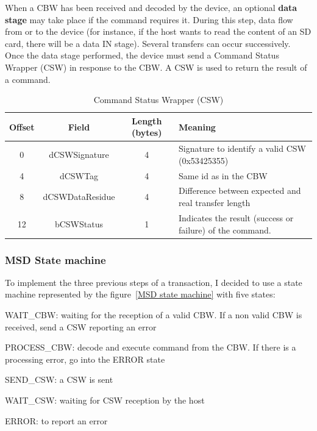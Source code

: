 \documentclass[pdftex,10pt,a4paper]{report}
\newenvironment{packed_item}{
\begin{itemize}
  \setlength{\itemsep}{1pt}
  \setlength{\parskip}{0pt}
  \setlength{\parsep}{0pt}
}{\end{itemize}}
\begin{document}
When a CBW has been received and decoded by the device, an optional \textbf{data stage} may take
place if the command requires it. During this step, data flow from or to the device (for instance, if the host wants to read the content of an SD card, there will be a data IN stage). Several transfers can occur successively.
\\

Once the data stage performed, the device must send a Command Status Wrapper (CSW) in response to the CBW. A CSW is used to return the result of a command.

\begin{table}[h!]
\centering
\begin{tabular}{|c|c|c| >{\arraybackslash}m{9cm} |}
\hline

Offset & Field & Length (bytes) & Meaning \\ \hline
0 & dCSWSignature & 4 & Signature to identify a valid CSW (0x53425355) \\ \hline
4 & dCSWTag & 4 &  Same id as in the CBW \\ \hline
8 & dCSWDataResidue & 4 & Difference between expected and real transfer length \\ \hline
12 & bCSWStatus & 1 & Indicates the result (success or failure) of the command. \\ \hline

\end{tabular}
\caption{Command Status Wrapper (CSW)}
\label{Command Status Wrapper (CSW)}
\end{table}

\subsubsection{MSD State machine}
To implement the three previous steps of a transaction, I decided to use a state machine represented by the figure~\ref{MSD state machine} with five states:
\begin{packed_item}
	\item WAIT\_CBW: waiting for the reception of a valid CBW. If a non valid CBW is received, send a CSW reporting an error
	\item PROCESS\_CBW: decode and execute command from the CBW. If there is a processing error, go into the ERROR state
	\item SEND\_CSW: a CSW is sent
	\item WAIT\_CSW: waiting for CSW reception by the host
	\item ERROR: to report an error
\end{packed_item}
\end{document}
